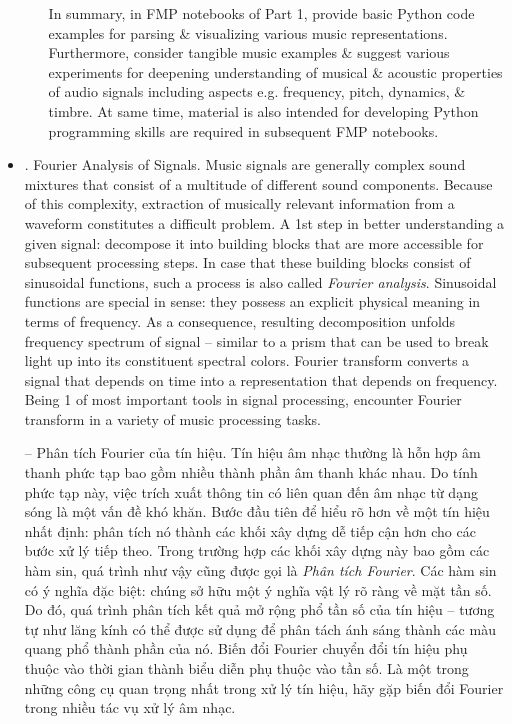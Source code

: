 \documentclass{article}
\begin{document}
\begin{itemize}
\begin{itemize}
		In summary, in FMP notebooks of Part 1, provide basic Python code examples for parsing \& visualizing various music representations. Furthermore, consider tangible music examples \& suggest various experiments for deepening understanding of musical \& acoustic properties of audio signals including aspects e.g. frequency, pitch, dynamics, \& timbre. At same time, material is also intended for developing Python programming skills are required in subsequent FMP notebooks.
	\end{itemize}
	\item {. Fourier Analysis of Signals.} Music signals are generally complex sound mixtures that consist of a multitude of different sound components. Because of this complexity, extraction of musically relevant information from a waveform constitutes a difficult problem. A 1st step in better understanding a given signal: decompose it into building blocks that are more accessible for subsequent processing steps. In case that these building blocks consist of sinusoidal functions, such a process is also called {\it Fourier analysis}. Sinusoidal functions are special in sense: they possess an explicit physical meaning in terms of frequency. As a consequence, resulting decomposition unfolds frequency spectrum of signal -- similar to a prism that can be used to break light up into its constituent spectral colors. Fourier transform converts a signal that depends on time into a representation that depends on frequency. Being 1 of most important tools in signal processing, encounter Fourier transform in a variety of music processing tasks.
	
	-- {\sf Phân tích Fourier của tín hiệu.} Tín hiệu âm nhạc thường là hỗn hợp âm thanh phức tạp bao gồm nhiều thành phần âm thanh khác nhau. Do tính phức tạp này, việc trích xuất thông tin có liên quan đến âm nhạc từ dạng sóng là một vấn đề khó khăn. Bước đầu tiên để hiểu rõ hơn về một tín hiệu nhất định: phân tích nó thành các khối xây dựng dễ tiếp cận hơn cho các bước xử lý tiếp theo. Trong trường hợp các khối xây dựng này bao gồm các hàm sin, quá trình như vậy cũng được gọi là {\it Phân tích Fourier}. Các hàm sin có ý nghĩa đặc biệt: chúng sở hữu một ý nghĩa vật lý rõ ràng về mặt tần số. Do đó, quá trình phân tích kết quả mở rộng phổ tần số của tín hiệu -- tương tự như lăng kính có thể được sử dụng để phân tách ánh sáng thành các màu quang phổ thành phần của nó. Biến đổi Fourier chuyển đổi tín hiệu phụ thuộc vào thời gian thành biểu diễn phụ thuộc vào tần số. Là một trong những công cụ quan trọng nhất trong xử lý tín hiệu, hãy gặp biến đổi Fourier trong nhiều tác vụ xử lý âm nhạc.
	

\end{itemize}
\end{document}
